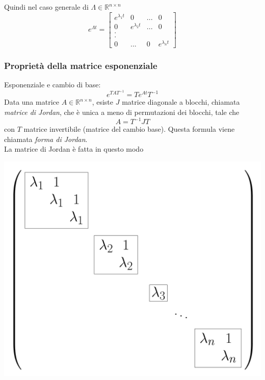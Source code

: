 \documentclass{article}
\numberwithin{equation}{subsection}
\begin{document}
Quindi nel caso generale di $\Lambda \in \mathbb{R}^{n \times n}$
\begin{equation}
    e^{\Lambda t} = 
    \begin{bmatrix}
        e^{\lambda_1 t} & 0 & ... & 0\\
        0 & e^{\lambda_2 t} & ... & 0\\
        .\\
        .\\
        0 & ... & 0 & e^{\lambda_n t}
    \end{bmatrix}
\end{equation}


\subsubsection{Proprietà della matrice esponenziale} \label{proprietà della matrice esponenziale}
Esponenziale e cambio di base:
\begin{equation}
    e^{TAT^{-1}} = Te^{At}T^{-1}
\end{equation}
Data una matrice $A \in \mathbb{R}^{n \times n}$, esiste $J$ matrice diagonale a blocchi, chiamata \textit{matrice di Jordan}, che è unica a meno di permutazioni dei blocchi, tale che
\begin{equation}
    A = T^{-1} J T
\end{equation}
con $T$ matrice invertibile (matrice del cambio base). Questa formula viene chiamata \textit{forma di Jordan}.
\vspace*{0.2cm}\\
La matrice di Jordan è fatta in questo modo
\begin{center}
    \includegraphics[scale=0.13]{Images/Jordan_matrix.png}
\end{center}
\end{document}
